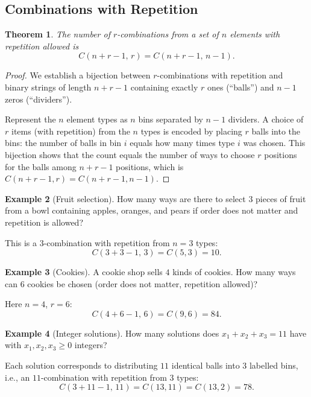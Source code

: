 \documentclass[11pt, a4paper, notitlepage]{report}
\newtheorem{theorem}{Theorem}[section]
\theoremstyle{definition}
\newtheorem{example}[theorem]{Example}
\theoremstyle{remark}
\begin{document}
\subsection{Combinations with Repetition}

\begin{theorem}
\label{thm:combrep}
The number of $r$-combinations from a set of $n$ elements \emph{with repetition allowed} is
\[
  C(n+r-1,\,r) = C(n+r-1,\,n-1).
\]
\end{theorem}

\begin{proof}
We establish a bijection between $r$-combinations with repetition and binary strings of length
$n+r-1$ containing exactly $r$ ones (``balls'') and $n-1$ zeros (``dividers'').

Represent the $n$ element types as $n$ bins separated by $n-1$ dividers.  A choice of $r$
items (with repetition) from the $n$ types is encoded by placing $r$ balls into the bins: the
number of balls in bin $i$ equals how many times type $i$ was chosen.  This bijection shows
that the count equals the number of ways to choose $r$ positions for the balls among
$n+r-1$ positions, which is $C(n+r-1,r) = C(n+r-1,n-1)$.
\end{proof}

\begin{example}[Fruit selection]
How many ways are there to select $3$ pieces of fruit from a bowl containing apples, oranges,
and pears if order does not matter and repetition is allowed?

This is a $3$-combination with repetition from $n = 3$ types:
\[
  C(3+3-1,\,3) = C(5,3) = 10.
\]
\end{example}

\begin{example}[Cookies]
A cookie shop sells $4$ kinds of cookies.  How many ways can $6$ cookies be chosen (order
does not matter, repetition allowed)?

Here $n=4$, $r=6$:
\[
  C(4+6-1,\,6) = C(9,6) = 84.
\]
\end{example}

\begin{example}[Integer solutions]
\label{ex:eqnsols}
How many solutions does $x_1 + x_2 + x_3 = 11$ have with $x_1, x_2, x_3 \geq 0$ integers?

Each solution corresponds to distributing $11$ identical balls into $3$ labelled bins, i.e.,
an $11$-combination with repetition from $3$ types:
\[
  C(3+11-1,\,11) = C(13,11) = C(13,2) = 78.
\]
\end{example}
\end{document}
